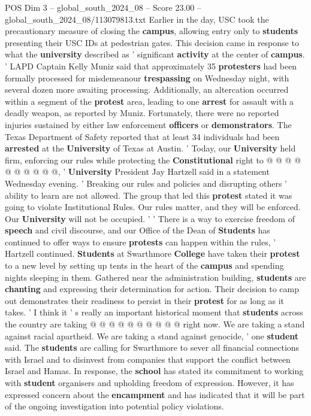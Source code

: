 \begin{textsample}{POS Dim 3 – global\_south\_2024\_08 – Score 23.00 – global\_south\_2024\_08/113079813.txt}
Earlier in the day, USC took the precautionary measure of closing the \textbf{campus}, allowing entry only to \textbf{students} presenting their USC IDs at pedestrian gates.
This decision came in response to what the \textbf{university} described as ' significant \textbf{activity} at the center of \textbf{campus}. ' LAPD Captain Kelly Muniz said that approximately 35 \textbf{protesters} had been formally processed for misdemeanour \textbf{trespassing} on Wednesday night, with several dozen more awaiting processing.
Additionally, an altercation occurred within a segment of the \textbf{protest} area, leading to one \textbf{arrest} for assault with a deadly weapon, as reported by Muniz.
Fortunately, there were no reported injuries sustained by either law enforcement \textbf{officers} or \textbf{demonstrators}.
The Texas Department of Safety reported that at least 34 individuals had been \textbf{arrested} at the \textbf{University} of Texas at Austin. ' Today, our \textbf{University} held firm, enforcing our rules while protecting the \textbf{Constitutional} right to @ @ @ @ @ @ @ @ @ @, ' \textbf{University} President Jay Hartzell said in a statement Wednesday evening. ' Breaking our rules and policies and disrupting others ' ability to learn are not allowed.
The group that led this \textbf{protest} stated it was going to violate Institutional Rules.
Our rules matter, and they will be enforced.
Our \textbf{University} will not be occupied. ' ' There is a way to exercise freedom of \textbf{speech} and civil discourse, and our Office of the Dean of \textbf{Students} has continued to offer ways to ensure \textbf{protests} can happen within the rules, ' Hartzell continued. \textbf{Students} at Swarthmore \textbf{College} have taken their \textbf{protest} to a new level by setting up tents in the heart of the \textbf{campus} and spending nights sleeping in them.
Gathered near the administration building, \textbf{students} are \textbf{chanting} and expressing their determination for action.
Their decision to camp out demonstrates their readiness to persist in their \textbf{protest} for as long as it takes. ' I think it ' s really an important historical moment that \textbf{students} across the country are taking @ @ @ @ @ @ @ @ @ @ right now.
We are taking a stand against racial apartheid.
We are taking a stand against genocide, ' one \textbf{student} said.
The \textbf{students} are calling for Swarthmore to sever all financial connections with Israel and to disinvest from companies that support the conflict between Israel and Hamas.
In response, the \textbf{school} has stated its commitment to working with \textbf{student} organisers and upholding freedom of expression.
However, it has expressed concern about the \textbf{encampment} and has indicated that it will be part of the ongoing investigation into potential policy violations.

\end{textsample}
